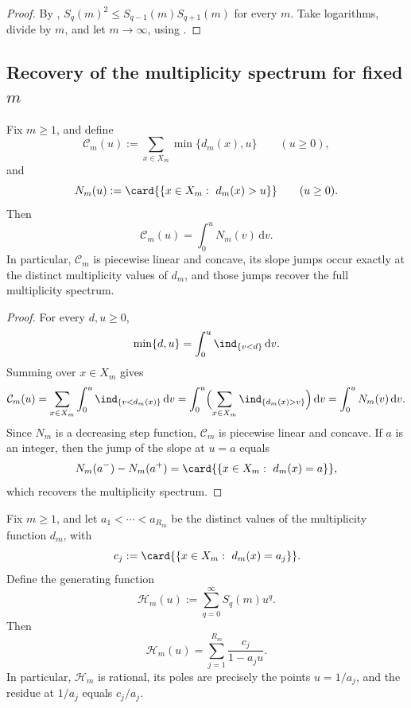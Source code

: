 \begin{proof}
By ,
\(S_q(m)^2\le S_{q-1}(m)S_{q+1}(m)\) for every \(m\).  Take logarithms, divide by
\(m\), and let \(m\to\infty\), using .
\end{proof}

\subsection{Recovery of the multiplicity spectrum for fixed \texorpdfstring{$m$}{m}}

\begin{theorem}
\label{thm:truncated-sum-curve}
Fix \(m\ge 1\), and define
\[
  \mathcal C_m(u):=\sum_{x\in X_m}\min\{d_m(x),u\}
  \qquad (u\ge 0),
\]
and
\[
  N_m(u):=\card{\{x\in X_m:\ d_m(x)>u\}}
  \qquad (u\ge 0).
\]
Then
\[
  \mathcal C_m(u)=\int_0^u N_m(v)\,\mathrm{d}v.
\]
In particular, \(\mathcal C_m\) is piecewise linear and concave, its slope
jumps occur exactly at the distinct multiplicity values of \(d_m\), and those
jumps recover the full multiplicity spectrum.
\end{theorem}

\begin{proof}
For every \(d,u\ge 0\),
\[
  \min\{d,u\}=\int_0^u \ind_{\{v<d\}}\,\mathrm{d}v.
\]
Summing over \(x\in X_m\) gives
\[
  \mathcal C_m(u)
  =
  \sum_{x\in X_m}\int_0^u \ind_{\{v<d_m(x)\}}\,\mathrm{d}v
  =
  \int_0^u
  \Bigl(\sum_{x\in X_m}\ind_{\{d_m(x)>v\}}\Bigr)\,\mathrm{d}v
  =
  \int_0^u N_m(v)\,\mathrm{d}v.
\]
Since \(N_m\) is a decreasing step function, \(\mathcal C_m\) is piecewise
linear and concave.  If \(a\) is an integer, then the jump of the slope at
\(u=a\) equals
\[
  N_m(a^-)-N_m(a^+)
  =
  \card{\{x\in X_m:\ d_m(x)=a\}},
\]
which recovers the multiplicity spectrum.
\end{proof}

\begin{theorem}
\label{thm:fiber-resolvent}
Fix \(m\ge 1\), and let \(a_1<\cdots<a_{R_m}\) be the distinct values of the
multiplicity function \(d_m\), with
\[
  c_j:=\card{\{x\in X_m:\ d_m(x)=a_j\}}.
\]
Define the generating function
\[
  \mathcal H_m(u):=\sum_{q=0}^{\infty} S_q(m)u^q.
\]
Then
\[
  \mathcal H_m(u)=\sum_{j=1}^{R_m}\frac{c_j}{1-a_ju}.
\]
In particular, \(\mathcal H_m\) is rational, its poles are precisely the points
\(u=1/a_j\), and the residue at \(1/a_j\) equals \(c_j/a_j\).
\end{theorem}

